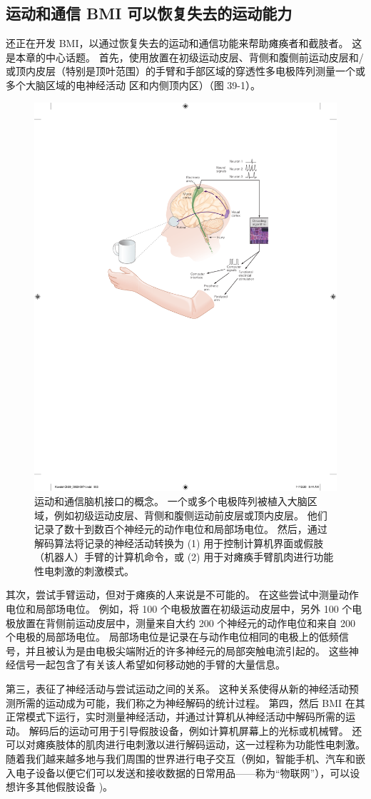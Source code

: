 \subsection{运动和通信 BMI 可以恢复失去的运动能力}

还正在开发 BMI，以通过恢复失去的运动和通信功能来帮助瘫痪者和截肢者。 
这是本章的中心话题。 
首先，使用放置在初级运动皮层、背侧和腹侧前运动皮层和/或顶内皮层（特别是顶叶范围）的手臂和手部区域的穿透性多电极阵列测量一个或多个大脑区域的电神经活动 区和内侧顶内区）（图 39-1）。

\begin{figure}[htbp]
	\centering
	\includegraphics[width=0.5\linewidth]{chap39/fig_39_1}
	\caption{运动和通信脑机接口的概念。 
		一个或多个电极阵列被植入大脑区域，例如初级运动皮层、背侧和腹侧运动前皮层或顶内皮层。 
		他们记录了数十到数百个神经元的动作电位和局部场电位。 
		然后，通过解码算法将记录的神经活动转换为 (1) 用于控制计算机界面或假肢（机器人）手臂的计算机命令，或 (2) 用于对瘫痪手臂肌肉进行功能性电刺激的刺激模式。}
	\label{fig:39_1}
\end{figure}


其次，尝试手臂运动，但对于瘫痪的人来说是不可能的。 
在这些尝试中测量动作电位和局部场电位。 
例如，将 100 个电极放置在初级运动皮层中，另外 100 个电极放置在背侧前运动皮层中，测量来自大约 200 个神经元的动作电位和来自 200 个电极的局部场电位。 
局部场电位是记录在与动作电位相同的电极上的低频信号，并且被认为是由电极尖端附近的许多神经元的局部突触电流引起的。 
这些神经信号一起包含了有关该人希望如何移动她的手臂的大量信息。


第三，表征了神经活动与尝试运动之间的关系。 
这种关系使得从新的神经活动预测所需的运动成为可能，我们称之为神经解码的统计过程。 
第四，然后 BMI 在其正常模式下运行，实时测量神经活动，并通过计算机从神经活动中解码所需的运动。 
解码后的运动可用于引导假肢设备，例如计算机屏幕上的光标或机械臂。 
还可以对瘫痪肢体的肌肉进行电刺激以进行解码运动，这一过程称为功能性电刺激。 
随着我们越来越多地与我们周围的世界进行电子交互（例如，智能手机、汽车和嵌入电子设备以便它们可以发送和接收数据的日常用品——称为“物联网”），可以设想许多其他假肢设备 )。


